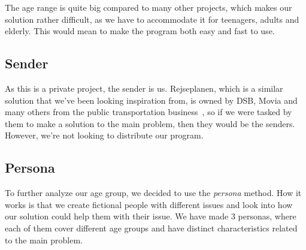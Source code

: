 The age range is quite big compared to many other projects, which makes our solution rather difficult, as we have to
accommodate it for teenagers, adults and elderly.
This would mean to make the program both easy and fast to use.

\subsection{Sender}\label{subsec:sender}

As this is a private project, the sender is us.
Rejseplanen, which is a similar solution that we've been looking inspiration from, is owned by DSB, Movia and many
others from the public transportation business~\cite{om_rejseplanen}, so if we were tasked by them to make a solution to
the main problem, then they would be the senders.
However, we're not looking to distribute our program.

\subsection{Persona}\label{subsec:persona}

To further analyze our age group, we decided to use the \textit{persona} method.
How it works is that we create fictional people with different issues and look into how our solution could help them
with their issue.
We have made 3 personas, where each of them cover different age groups and have distinct characteristics related to the
main problem.

\renewcommand{\arraystretch}{1.5}

